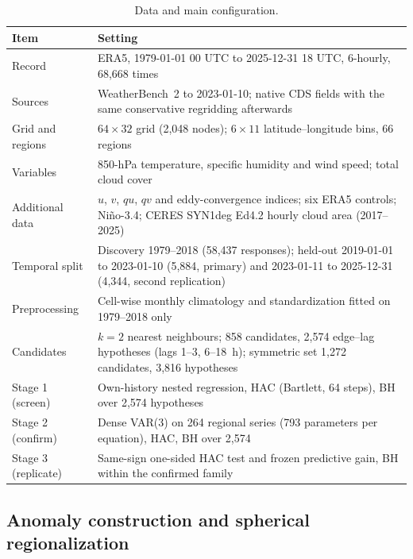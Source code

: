 \documentclass[preprint,12pt]{elsarticle}
\begin{document}
\begin{table}[htbp]
\centering
\caption{Data and main configuration.}
\label{tab:data}
\footnotesize
\begin{tabular}{@{}p{}p{}@{}}
\toprule
Item & Setting \\
\midrule
Record & ERA5, 1979-01-01 00 UTC to 2025-12-31 18 UTC, 6-hourly, 68,668 times \\
Sources & WeatherBench~2 to 2023-01-10; native CDS fields with the same conservative regridding afterwards \\
Grid and regions & $64\times32$ grid (2,048 nodes); $6\times11$ latitude--longitude bins, 66 regions \\
Variables & 850-hPa temperature, specific humidity and wind speed; total cloud cover \\
Additional data & $u$, $v$, $qu$, $qv$ and eddy-convergence indices; six ERA5 controls; Ni\~no-3.4; CERES SYN1deg Ed4.2 hourly cloud area (2017--2025) \\
Temporal split & Discovery 1979--2018 (58,437 responses); held-out 2019-01-01 to 2023-01-10 (5,884, primary) and 2023-01-11 to 2025-12-31 (4,344, second replication) \\
Preprocessing & Cell-wise monthly climatology and standardization fitted on 1979--2018 only \\
Candidates & $k=2$ nearest neighbours; 858 candidates, 2,574 edge--lag hypotheses (lags 1--3, 6--18~h); symmetric set 1,272 candidates, 3,816 hypotheses \\
Stage 1 (screen) & Own-history nested regression, HAC (Bartlett, 64 steps), BH over 2,574 hypotheses \\
Stage 2 (confirm) & Dense VAR(3) on 264 regional series (793 parameters per equation), HAC, BH over 2,574 \\
Stage 3 (replicate) & Same-sign one-sided HAC test and frozen predictive gain, BH within the confirmed family \\
\bottomrule
\end{tabular}
\end{table}

\subsection{Anomaly construction and spherical regionalization}
\label{subsec:anom}
\end{document}
